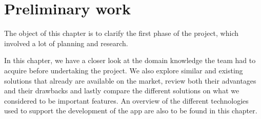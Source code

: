 \chapter{Preliminary work}

\label{sec:prestudy}
The object of this chapter is to clarify the first phase of the project, which involved a lot of planning and research. 

In this chapter, we have a closer look at the domain knowledge the team had to acquire before undertaking the project. We also explore similar and existing solutions that already are available on the market, review both their advantages and their drawbacks and lastly compare the different solutions on what we considered to be important features. An overview of the different technologies used to support the development of the app are also to be found in this chapter.


\newpage




